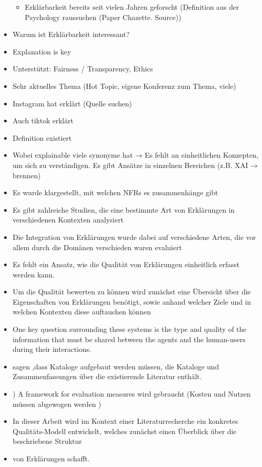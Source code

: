 \begin{itemize}
\begin{itemize}
        \item Erklärbarkeit bereits seit vielen Jahren geforscht (Definition aus der Psychology raussuchen (Paper Chazette. Source))
    \end{itemize}
    \item Warum ist Erklärbarkeit interessant?
    \item Explanation is key \cite{jaimes2007guest}
    \item Unterstützt: Fairness / Transparency, Ethics
    \item Sehr aktuelles Thema (Hot Topic, eigene Konferenz zum Thema, viele)
    \item Instagram hat erklärt (Quelle suchen)
    \item Auch tiktok erklärt
    \item Definition existiert
    \item Wobei explainable viele synonyme hat → Es fehlt an einheitlichen Konzepten, um sich zu verständigen. Es gibt Ansätze in einzelnen Bereichen (z.B. XAI → brennen)
    \item Es wurde klargestellt, mit welchen NFRs es zusammenhänge gibt
    \item Es gibt zahlreiche Studien, die eine bestimmte Art von Erklärungen in verschiedenen Kontexten analysiert
    \item Die Integration von Erklärungen wurde dabei auf verschiedene Arten, die vor allem durch die Domänen verschieden waren evaluiert
    \item Es fehlt ein Ansatz, wie die Qualität von Erklärungen einheitlich erfasst werden kann.
    \item Um die Qualität bewerten zu können  wird zunächst eine Übersicht über die Eigenschaften von Erklärungen benötigt, sowie anhand welcher Ziele und in welchen Kontexten diese auftauchen können
    \item One key question surrounding these systems is the type and quality of the information that must be shared between the agents and the human-users during their interactions. \cite{rosenfeld_explainability_2019}
    \item \cite{kohl_explainability_2019, chung2009non} sagen ,dass Kataloge aufgebaut werden müssen, die Kataloge und Zusammenfassungen über die existierende Literatur enthält.
    \item \cite{cassens_ambient_2019}) A framework for evaluation measures wird gebraucht (Kosten und Nutzen müssen abgewogen werden \cite{chazette_end-users_nodate})
    \item In dieser Arbeit wird im Kontext einer Literaturrecherche ein konkretes Qualitäts-Modell entwickelt, welches zunächst einen Überblick über die beschriebene Struktur     \item von Erklärungen schafft.

\end{itemize}

